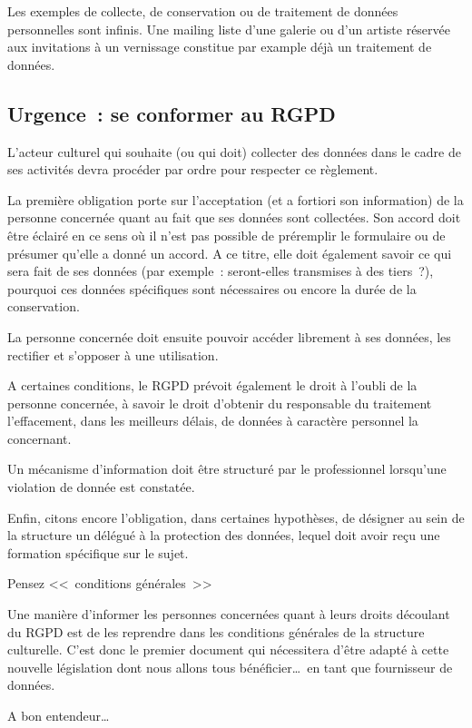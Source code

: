 \documentclass[11pt, french]{article}
\begin{document}
Les exemples de collecte, de conservation ou de traitement de données
personnelles sont infinis. Une mailing liste d'une galerie ou d'un
artiste réservée aux invitations à un vernissage constitue par example
déjà un traitement de données.

\subsection{Urgence~: se conformer au RGPD}

L'acteur culturel qui souhaite (ou qui doit) collecter des données
dans le cadre de ses activités devra procéder par ordre pour respecter
ce règlement.

La première obligation porte sur l'acceptation (et a fortiori son
information) de la personne concernée quant au fait que ses données
sont collectées. Son accord doit être éclairé en ce sens où il n'est
pas possible de préremplir le formulaire ou de présumer qu'elle a
donné un accord. A ce titre, elle doit également savoir ce qui sera
fait de ses données (par exemple~: seront-elles transmises à des
tiers~?), pourquoi ces données spécifiques sont nécessaires ou encore la
durée de la conservation.

La personne concernée doit ensuite pouvoir accéder librement à ses
données, les rectifier et s'opposer à une utilisation.

A certaines conditions, le RGPD prévoit également le droit à l'oubli
de la personne concernée, à savoir le droit d'obtenir du responsable
du traitement l'effacement, dans les meilleurs délais, de données à
caractère personnel la concernant.

Un mécanisme d'information doit être structuré par le professionnel
lorsqu'une violation de donnée est constatée.

Enfin, citons encore l'obligation, dans certaines hypothèses, de
désigner au sein de la structure un délégué à la protection des
données, lequel doit avoir reçu une formation spécifique sur le sujet.

Pensez <<~conditions générales~>>

Une manière d'informer les personnes concernées quant à leurs droits
découlant du RGPD est de les reprendre dans les conditions générales
de la structure culturelle. C'est donc le premier document qui
nécessitera d'être adapté à cette nouvelle législation dont nous
allons tous bénéficier\ldots\ en tant que fournisseur de données.

A bon entendeur\ldots
\end{document}
